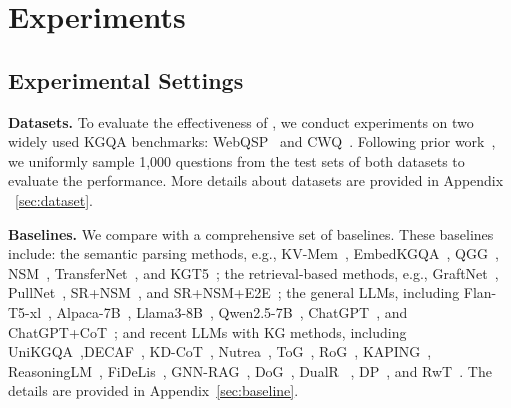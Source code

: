 \section{Experiments}




\subsection{Experimental Settings}
\textbf{Datasets.} {To evaluate the effectiveness of \method{}, we conduct experiments on two widely used KGQA benchmarks: WebQSP~\cite{talmor2018web} and CWQ~\cite{yih2016value}. Following prior work~\cite{sun2023think,liu2025dual}, we uniformly sample 1,000 questions from the test sets of both datasets to evaluate the performance.} More details about datasets are provided in Appendix ~\ref{sec:dataset}. 



\noindent\textbf{Baselines.} We compare \method{} with a comprehensive set of baselines. These baselines include: the semantic parsing methods, e.g., KV-Mem~\citep{miller2016key}, EmbedKGQA~\citep{saxena2020improving}, QGG~\citep{lan2020query}, NSM~\citep{he2021improving}, TransferNet~\citep{shi2021transfernet}, and KGT5~\citep{saxena2022sequence};
the retrieval-based methods, e.g., GraftNet~\citep{sun2018open}, PullNet~\citep{sun2019pullnet}, SR+NSM~\citep{zhang2022subgraph}, and SR+NSM+E2E~\citep{zhang2022subgraph};
the general LLMs, including 
Flan-T5-xl~\citep{chung2024scaling}, Alpaca-7B~\citep{taori2023stanford},
Llama3-8B~\citep{dubey2024llama}, Qwen2.5-7B~\citep{team2024qwen2}, ChatGPT~\citep{schulman2022chatgpt}, and ChatGPT+CoT~\citep{wei2022chain};
and recent LLMs with KG methods, including UniKGQA~\citep{jiang2022unikgqa},DECAF~\citep{yu2022decaf}, KD-CoT~\citep{wang2023knowledge},
Nutrea~\citep{choi2023nutrea}, ToG~\citep{sun2023think}, RoG~\citep{luo2023reasoning}, KAPING~\citep{baek2023knowledge}, ReasoningLM~\citep{jiang2023reasoninglm},
FiDeLis~\citep{sui2024fidelis}, GNN-RAG~\citep{mavromatis2024gnn},
DoG~\citep{ma2025debate},  DualR~\citep{liu2025dual}
, DP~\citep{ma2025deliberation}, and RwT~\citep{shen2025reasoning}. The details are provided in Appendix~\ref{sec:baseline}.

